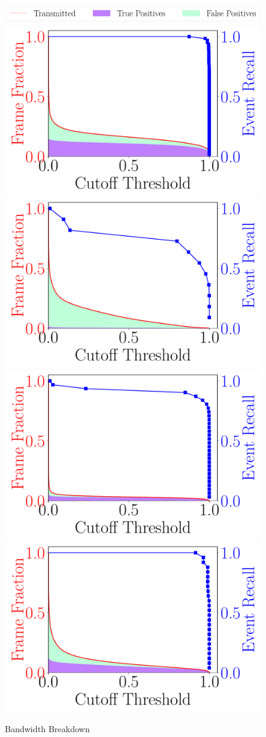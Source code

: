 \begin{figure}[h]
    \centering
    \includegraphics[width=.9\linewidth]{FIGS/fig-event-recall-frame-percentage-legend.pdf}
    \includegraphics[width=.48\linewidth]{FIGS/fig-event-recall-frame-percentage-vs-threshold-okutama.pdf}
    \includegraphics[width=.48\linewidth]{FIGS/fig-event-recall-frame-percentage-vs-threshold-stanford.pdf}
    \includegraphics[width=.48\linewidth]{FIGS/fig-event-recall-frame-percentage-vs-threshold-raft.pdf}
    \includegraphics[width=.48\linewidth]{FIGS/fig-event-recall-frame-percentage-vs-threshold-elephant.pdf}
\caption{Bandwidth Breakdown}
\label{fig:earlydiscard-frame-percent-breakdown}
\end{figure}

